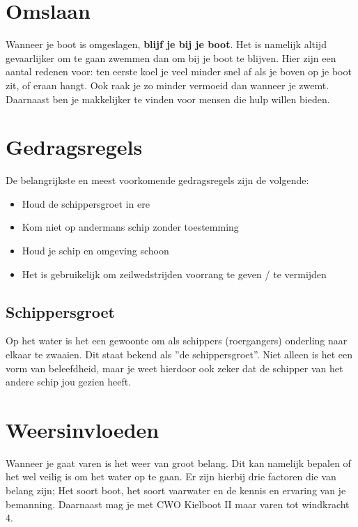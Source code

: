 \section{Omslaan}
Wanneer je boot is omgeslagen, \textbf{blijf je bij je boot}. Het is namelijk altijd gevaarlijker om te gaan zwemmen dan om bij je boot te blijven. Hier zijn een aantal redenen voor: ten eerste koel je veel minder snel af als je boven op je boot zit, of eraan hangt. Ook raak je zo minder vermoeid dan wanneer je zwemt. Daarnaast ben je makkelijker te vinden voor mensen die hulp willen bieden.
\section{Gedragsregels}
De belangrijkste en meest voorkomende gedragsregels zijn de volgende:
\begin{itemize}
    \item Houd de schippersgroet in ere
    \item Kom niet op andermans schip zonder toestemming
    \item Houd je schip en omgeving schoon
    \item Het is gebruikelijk om zeilwedstrijden voorrang te geven / te vermijden
\end{itemize}
\subsection*{Schippersgroet}
Op het water is het een gewoonte om als schippers (roergangers) onderling naar elkaar te zwaaien. Dit staat bekend als ''de schippersgroet''. Niet alleen is het een vorm van beleefdheid, maar je weet hierdoor ook zeker dat de schipper van het andere schip jou gezien heeft. 

\section{Weersinvloeden}
Wanneer je gaat varen is het weer van groot belang. Dit kan namelijk bepalen of het wel veilig is om het water op te gaan. Er zijn hierbij drie factoren die van belang zijn; Het soort boot, het soort vaarwater en de kennis en ervaring van je bemanning. Daarnaast mag je met CWO Kielboot II maar varen tot windkracht 4.

